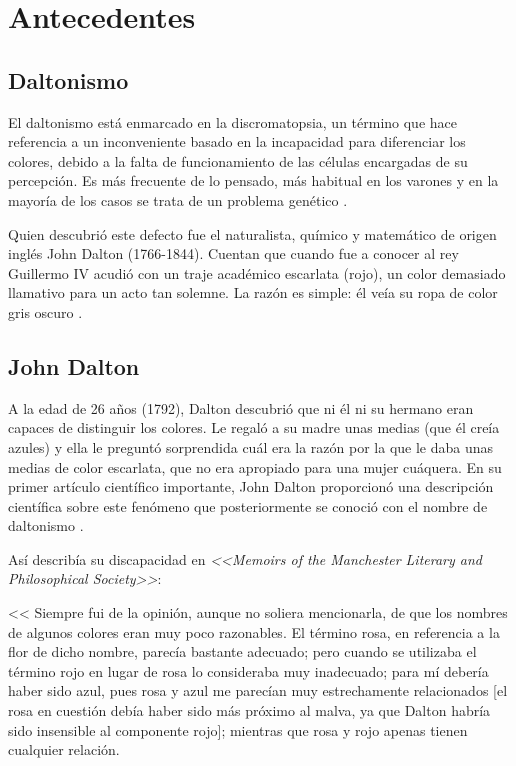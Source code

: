 \documentclass[10pt]{article}
\begin{document}
\section{Antecedentes}
\subsection{Daltonismo}
El daltonismo está enmarcado en la discromatopsia, un término que hace referencia a un inconveniente basado en la incapacidad para diferenciar los colores, debido a la falta de funcionamiento de las células encargadas de su percepción. Es más frecuente de lo pensado, más habitual en los varones y en la mayoría de los casos se trata de un problema genético \cite{IEEEreferencias:Ref1}\cite{IEEEreferencias:Ref2}.

\setlength{\parskip}{2mm}

Quien descubrió este defecto fue el naturalista, químico y matemático de origen inglés John Dalton (1766-1844).
Cuentan que cuando fue a conocer al rey Guillermo IV acudió con un traje académico escarlata (rojo), un color demasiado llamativo para un acto tan solemne. La razón es simple: él veía su ropa de color gris oscuro \cite{IEEEreferencias:Ref1}.

\subsection{John Dalton}

A la edad de 26 años (1792), Dalton descubrió que ni él ni su hermano eran capaces de distinguir los colores. Le regaló a su madre unas medias (que él creía azules) y ella le preguntó sorprendida cuál era la razón por la que le daba unas medias de color escarlata, que no era apropiado para una mujer cuáquera. En su primer artículo científico importante, John Dalton proporcionó una descripción científica sobre este fenómeno que posteriormente se conoció con el nombre de daltonismo \cite{IEEEreferencias:Ref1}.

\setlength{\parskip}{2mm}

Así describía su discapacidad en \textit{<<Memoirs of the Manchester Literary and Philosophical Society>>}:

<< Siempre fui de la opinión, aunque no soliera mencionarla, de que los nombres de algunos colores eran muy poco razonables. El término rosa, en referencia a la flor de dicho nombre, parecía bastante adecuado; pero cuando se utilizaba el término rojo en lugar de rosa lo consideraba muy inadecuado; para mí debería haber sido azul, pues rosa y azul me parecían muy estrechamente relacionados [el rosa en cuestión debía haber sido más próximo al malva, ya que Dalton habría sido insensible al componente rojo]; mientras que rosa y rojo apenas tienen cualquier relación. 
\end{document}
